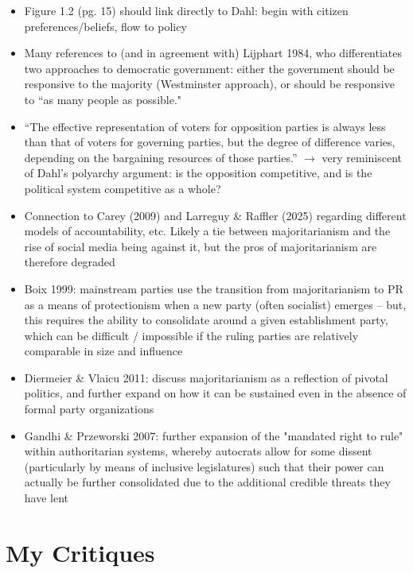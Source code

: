 \documentclass[12pt]{article}
\begin{document}
\begin{itemize}
    \item Figure 1.2 (pg. 15) should link directly to Dahl: begin with citizen preferences/beliefs, flow to policy
    \item Many references to (and in agreement with) Lijphart 1984, who differentiates two approaches to democratic government: either the government should be responsive to the majority (Westminster approach), or should be responsive to ``as many people as possible."
    \item ``The effective representation of voters for opposition parties is always less than that of voters for governing parties, but the degree of difference varies, depending on the bargaining resources of those parties.'' $\rightarrow$ very reminiscent of Dahl's polyarchy argument: is the opposition competitive, and is the political system competitive as a whole?
    \item Connection to Carey (2009) and Larreguy \& Raffler (2025) regarding different models of accountability, etc. Likely a tie between majoritarianism and the rise of social media being against it, but the pros of majoritarianism are therefore degraded
    \item Boix 1999: mainstream parties use the transition from majoritarianism to PR as a means of protectionism when a new party (often socialist) emerges -- but, this requires the ability to consolidate around a given establishment party, which can be difficult / impossible if the ruling parties are relatively comparable in size and influence
    \item Diermeier \& Vlaicu 2011: discuss majoritarianism as a reflection of pivotal politics, and further expand on how it can be sustained even in the absence of formal party organizations
    \item Gandhi \& Przeworski 2007: further expansion of the "mandated right to rule" within authoritarian systems, whereby autocrats allow for some dissent (particularly by means of inclusive legislatures) such that their power can actually be further consolidated due to the additional credible threats they have lent
\end{itemize}


\section{My Critiques}
\end{document}
